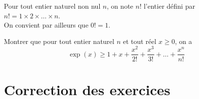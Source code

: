 \documentclass[11pt,fleqn]{book} %
\begin{document}
\begin{exercise}Pour tout entier naturel non nul $n$, on note $n!$ l'entier défini par $n! = 1 \times 2 \times \ldots \times n$.\\ On convient par ailleurs que $0!=1$.

Montrer que pour tout entier naturel $n$ et tout réel $x\geqslant 0$, on a
\[\exp(x)\geqslant 1 + x + \dfrac{x^2}{2!}+\dfrac{x^3}{3!}+\ldots + \dfrac{x^n}{n!}\]\end{exercise}

\chapter{Correction des exercices}

\printsolutions[headings={false}]
\end{document}
